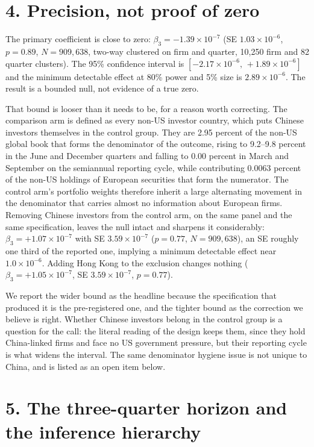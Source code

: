 \documentclass[11pt]{article}
\begin{document}
\section*{4. Precision, not proof of zero}

The primary coefficient is close to zero: $\beta_3 = -1.39\times10^{-7}$
(SE $1.03\times10^{-6}$, $p = 0.89$, $N = 909{,}638$, two-way clustered on
firm and quarter, 10,250 firm and 82 quarter clusters). The 95\% confidence
interval is $[-2.17\times10^{-6},\, +1.89\times10^{-6}]$ and the minimum
detectable effect at 80\% power and 5\% size is $2.89\times10^{-6}$. The
result is a bounded null, not evidence of a true zero.

That bound is looser than it needs to be, for a reason worth correcting. The
comparison arm is defined as every non-US investor country, which puts Chinese
investors themselves in the control group. They are 2.95 percent of the non-US
global book that forms the denominator of the outcome, rising to 9.2--9.8
percent in the June and December quarters and falling to 0.00 percent in March
and September on the semiannual reporting cycle, while contributing 0.0063
percent of the non-US holdings of European securities that form the numerator.
The control arm's portfolio weights therefore inherit a large alternating
movement in the denominator that carries almost no information about European
firms. Removing Chinese investors from the control arm, on the same panel and
the same specification, leaves the null intact and sharpens it considerably:
$\beta_3 = +1.07\times10^{-7}$ with SE $3.59\times10^{-7}$ ($p = 0.77$,
$N = 909{,}638$), an SE roughly one third of the reported one, implying a
minimum detectable effect near $1.0\times10^{-6}$. Adding Hong Kong to the
exclusion changes nothing ($\beta_3 = +1.05\times10^{-7}$, SE
$3.59\times10^{-7}$, $p = 0.77$).

We report the wider bound as the headline because the specification that
produced it is the pre-registered one, and the tighter bound as the correction
we believe is right. Whether Chinese investors belong in the control group is
a question for the call: the literal reading of the design keeps them, since
they hold China-linked firms and face no US government pressure, but their
reporting cycle is what widens the interval. The same denominator hygiene
issue is not unique to China, and is listed as an open item below.

\section*{5. The three-quarter horizon and the inference hierarchy}
\end{document}

